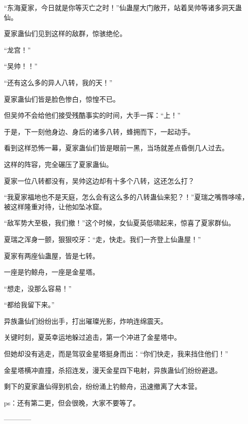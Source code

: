 \begin{this_body}
“东海夏家，今日就是你等灭亡之时！”仙蛊屋大门敞开，站着吴帅等诸多洞天蛊仙。

夏家蛊仙们见到这样的敌群，惊骇绝伦。

“龙宫！”

“吴帅！！”

“还有这么多的异人八转，我的天！”

夏家蛊仙们皆是脸色惨白，惊惶不已。

但吴帅不会给他们接受残酷事实的时间，大手一挥：“上！”

于是，下一刻他身边、身后的诸多八转，蜂拥而下，一起动手。

看到这样恐怖一幕，夏家蛊仙们皆是眼前一黑，当场就差点昏倒几人过去。

这样的阵容，完全碾压了夏家蛊仙。

夏家一位八转都没有，吴帅这边却有十多个八转，这还怎么打？

“我夏家福地也不是天庭，怎么会有这么多的八转蛊仙来犯？！”夏瑞之嘴唇哆嗦，被这样隆重对待，让他如坠冰窟。

“敌军势大至极，我们撤！”这个时候，女仙夏英低啸起来，惊喜了夏家群仙。

夏瑞之浑身一颤，狠狠咬牙：“走，快走。我们一齐登上仙蛊屋！”

夏家有两座仙蛊屋，皆是七转。

一座是钓鲸舟，一座是金星塔。

“想走，没那么容易！”

“都给我留下来。”

异族蛊仙们纷纷出手，打出璀璨光影，炸响连绵震天。

关键时刻，夏英幸运地躲过追击，第一个冲进了金星塔中。

但她却没有逃走，而是驾驭金星塔挺身而出：“你们快走，我来挡住他们！”

金星塔横冲直撞，杀招连发，漫天金星四下电射，异族蛊仙们纷纷避退。

剩下的夏家蛊仙得到机会，纷纷涌上钓鲸舟，迅速撤离了大本营。

ps：还有第二更，但会很晚，大家不要等了。

------------

\end{this_body}

